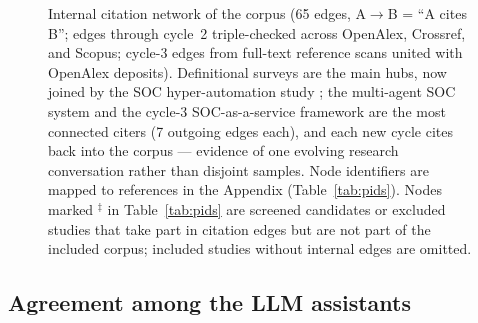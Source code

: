 \documentclass{ieeeaccess}
\begin{document}
\begin{figure}[!t]
{%
}
\caption{Internal citation network of the corpus (65 edges,
A$\rightarrow$B = ``A cites B''; edges through cycle~2 triple-checked
across OpenAlex, Crossref, and Scopus; cycle-3 edges from full-text
reference scans united with OpenAlex deposits). Definitional surveys
\cite{P10,P14,P09} are the main hubs, now joined by the SOC
hyper-automation study \cite{P76}; the multi-agent SOC system \cite{P28}
and the cycle-3 SOC-as-a-service framework \cite{P97} are the most
connected citers (7 outgoing edges each), and each new cycle cites back
into the corpus --- evidence of one evolving research conversation
rather than disjoint samples. Node identifiers are mapped to references
in the Appendix (Table~\ref{tab:pids}). Nodes marked $^{\ddagger}$ in
Table~\ref{tab:pids} are screened candidates or excluded studies that
take part in citation edges but are not part of the included corpus;
included studies without internal edges are omitted.}
\label{fig:crosscite}
\end{figure}

\subsection{Agreement among the LLM assistants}
\label{sec:reliability}
\end{document}
